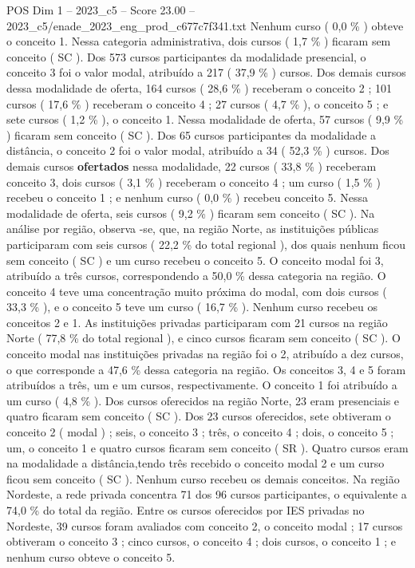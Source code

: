 \begin{textsample}{POS Dim 1 – 2023\_c5 – Score 23.00 – 2023\_c5/enade\_2023\_eng\_prod\_c677c7f341.txt}
Nenhum curso ( 0,0 \% ) obteve o conceito 1.
Nessa categoria administrativa, dois cursos ( 1,7 \% ) ficaram sem conceito ( SC ).
Dos 573 cursos participantes da modalidade presencial, o conceito 3 foi o valor modal, atribuído a 217 ( 37,9 \% ) cursos.
Dos demais cursos dessa modalidade de oferta, 164 cursos ( 28,6 \% ) receberam o conceito 2 ; 101 cursos ( 17,6 \% ) receberam o conceito 4 ; 27 cursos ( 4,7 \% ), o conceito 5 ; e sete cursos ( 1,2 \% ), o conceito 1.
Nessa modalidade de oferta, 57 cursos ( 9,9 \% ) ficaram sem conceito ( SC ).
Dos 65 cursos participantes da modalidade a distância, o conceito 2 foi o valor modal, atribuído a 34 ( 52,3 \% ) cursos.
Dos demais cursos \textbf{ofertados} nessa modalidade, 22 cursos ( 33,8 \% ) receberam conceito 3, dois cursos ( 3,1 \% ) receberam o conceito 4 ; um curso ( 1,5 \% ) recebeu o conceito 1 ; e nenhum curso ( 0,0 \% ) recebeu conceito 5.
Nessa modalidade de oferta, seis cursos ( 9,2 \% ) ficaram sem conceito ( SC ).
Na análise por região, observa -se, que, na região Norte, as instituições públicas participaram com seis cursos ( 22,2 \% do total regional ), dos quais nenhum ficou sem conceito ( SC ) e um curso recebeu o conceito 5.
O conceito modal foi 3, atribuído a três cursos, correspondendo a 50,0 \% dessa categoria na região.
O conceito 4 teve uma concentração muito próxima do modal, com dois cursos ( 33,3 \% ), e o conceito 5 teve um curso ( 16,7 \% ).
Nenhum curso recebeu os conceitos 2 e 1.
As instituições privadas participaram com 21 cursos na região Norte ( 77,8 \% do total regional ), e cinco cursos ficaram sem conceito ( SC ).
O conceito modal nas instituições privadas na região foi o 2, atribuído a dez cursos, o que corresponde a 47,6 \% dessa categoria na região.
Os conceitos 3, 4 e 5 foram atribuídos a três, um e um cursos, respectivamente.
O conceito 1 foi atribuído a um curso ( 4,8 \% ).
Dos cursos oferecidos na região Norte, 23 eram presenciais e quatro ficaram sem conceito ( SC ).
Dos 23 cursos oferecidos, sete obtiveram o conceito 2 ( modal ) ; seis, o conceito 3 ; três, o conceito 4 ; dois, o conceito 5 ; um, o conceito 1 e quatro cursos ficaram sem conceito ( SR ).
Quatro cursos eram na modalidade a distância,tendo três recebido o conceito modal 2 e um curso ficou sem conceito ( SC ).
Nenhum curso recebeu os demais conceitos.
Na região Nordeste, a rede privada concentra 71 dos 96 cursos participantes, o equivalente a 74,0 \% do total da região.
Entre os cursos oferecidos por IES privadas no Nordeste, 39 cursos foram avaliados com conceito 2, o conceito modal ; 17 cursos obtiveram o conceito 3 ; cinco cursos, o conceito 4 ; dois cursos, o conceito 1 ; e nenhum curso obteve o conceito 5.

\end{textsample}
